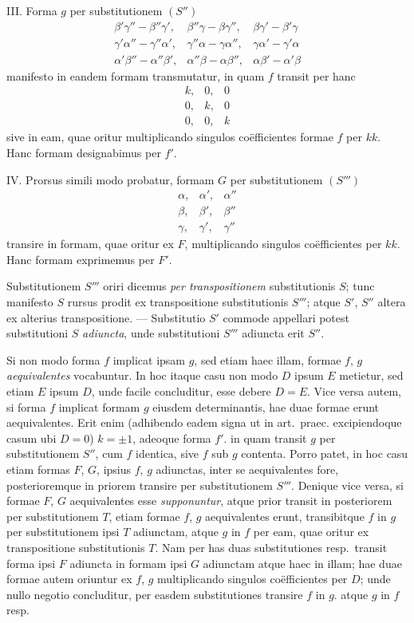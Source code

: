 III. Forma $g$ per substitutionem $(S'')$
\[
\begin{array}{ccc}
\beta'\gamma''-\beta''\gamma', & \beta''\gamma-\beta\gamma'', & \beta\gamma'-\beta'\gamma \\
\gamma'\alpha''-\gamma''\alpha', & \gamma''\alpha-\gamma\alpha'', & \gamma\alpha'-\gamma'\alpha \\
\alpha'\beta''-\alpha''\beta', & \alpha''\beta-\alpha\beta'', & \alpha\beta'-\alpha'\beta
\end{array}
\]
manifesto in eandem formam transmutatur, in quam $f$ transit per hanc
\[
\begin{array}{ccc}
k, & 0, & 0 \\
0, & k, & 0 \\
0, & 0, & k
\end{array}
\]
sive in eam, quae oritur multiplicando singulos co\"efficientes formae $f$ per $kk$.
Hanc formam designabimus per $f'$.

IV. Prorsus simili modo probatur, formam $G$ per substitutionem $(S''')$
\[
\begin{array}{ccc}
\alpha, & \alpha', & \alpha'' \\
\beta, & \beta', & \beta'' \\
\gamma, & \gamma', & \gamma''
\end{array}
\]
transire in formam, quae oritur ex $F$, multiplicando singulos co\"efficientes per $kk$.
Hanc formam exprimemus per $F'$.

Substitutionem $S'''$ oriri dicemus \textit{per transpositionem} substitutionis $S$;
tunc manifesto $S$ rursus prodit ex transpositione substitutionis $S'''$; atque $S'$, $S''$
altera ex alterius transpositione. --- Substitutio $S'$ commode appellari potest
substitutioni $S$ \textit{adiuncta}, unde substitutioni $S'''$ adiuncta erit $S''$.

Si non modo forma $f$ implicat ipsam $g$, sed etiam haec illam, formae $f$, $g$
\textit{aequivalentes} vocabuntur. In hoc itaque casu non modo $D$ ipsum $E$ metietur,
sed etiam $E$ ipsum $D$, unde facile concluditur, esse debere $D=E$. Vice
versa autem, si forma $f$ implicat formam $g$ eiusdem determinantis, hae duae
formae erunt aequivalentes. Erit enim (adhibendo eadem signa ut in art.\ praec.
excipiendoque casum ubi $D=0$) $k=\pm1$, adeoque forma $f'$. in quam transit
$g$ per substitutionem $S''$, cum $f$ identica, sive $f$ sub $g$ contenta. Porro patet,
in hoc casu etiam formas $F$, $G$, ipsius $f$, $g$ adiunctas, inter se aequivalentes
fore, posterioremque in priorem transire per substitutionem $S'''$. Denique vice
versa, si formae $F$, $G$ aequivalentes esse \textit{supponuntur}, atque prior transit in
posteriorem per substitutionem $T$, etiam formae $f$, $g$ aequivalentes erunt, transibitque
$f$ in $g$ per substitutionem ipsi $T$ adiunctam, atque $g$ in $f$ per eam,
quae oritur ex transpositione substitutionis $T$. Nam per has duas substitutiones
resp.\ transit forma ipsi $F$ adiuncta in formam ipsi $G$ adiunctam atque haec in
illam; hae duae formae autem oriuntur ex $f$, $g$ multiplicando singulos co\"efficientes
per $D$; unde nullo negotio concluditur, per easdem substitutiones transire
$f$ in $g$. atque $g$ in $f$ resp.

